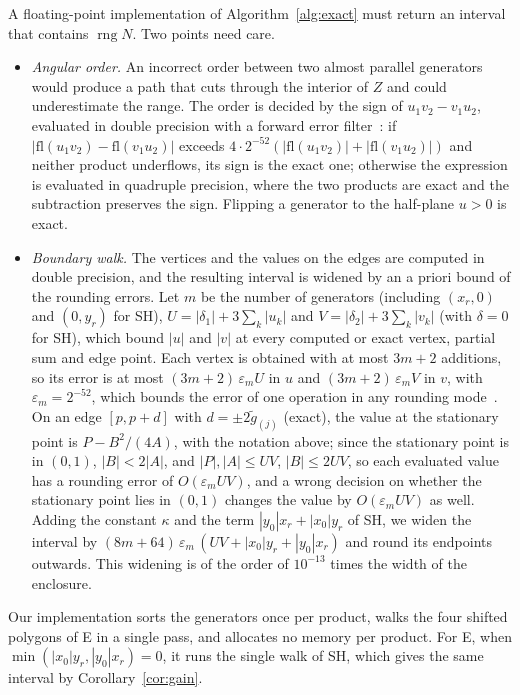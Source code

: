 \documentclass[10pt]{article}
\theoremstyle{definition}
\newcommand{\eps}{\varepsilon}
\newcommand{\rng}{\operatorname{rng}}
\begin{document}
A floating-point implementation of Algorithm~\ref{alg:exact} must return an interval that contains $\rng N$. Two points need care.
\begin{itemize}
\item \emph{Angular order.} An incorrect order between two almost parallel generators would produce a path that cuts through the interior of $Z$ and could underestimate the range. The order is decided by the sign of $u_1v_2-v_1u_2$, evaluated in double precision with a forward error filter~\cite{shewchuk1997adaptive}: if $|\mathrm{fl}(u_1v_2)-\mathrm{fl}(v_1u_2)|$ exceeds $4\cdot2^{-52}(|\mathrm{fl}(u_1v_2)|+|\mathrm{fl}(v_1u_2)|)$ and neither product underflows, its sign is the exact one; otherwise the expression is evaluated in quadruple precision, where the two products are exact and the subtraction preserves the sign. Flipping a generator to the half-plane $u>0$ is exact.
\item \emph{Boundary walk.} The vertices and the values on the edges are computed in double precision, and the resulting interval is widened by an a priori bound of the rounding errors. Let $m$ be the number of generators (including $(x_r,0)$ and $(0,y_r)$ for SH), $U=|\delta_1|+3\sum_k|u_k|$ and $V=|\delta_2|+3\sum_k|v_k|$ (with $\delta=0$ for SH), which bound $|u|$ and $|v|$ at every computed or exact vertex, partial sum and edge point. Each vertex is obtained with at most $3m+2$ additions, so its error is at most $(3m+2)\,\eps_m U$ in $u$ and $(3m+2)\,\eps_m V$ in $v$, with $\eps_m=2^{-52}$, which bounds the error of one operation in any rounding mode~\cite{higham2002accuracy}. On an edge $[p,p+d]$ with $d=\pm2\tilde g_{(j)}$ (exact), the value at the stationary point is $P-B^2/(4A)$, with the notation above; since the stationary point is in $(0,1)$, $|B|<2|A|$, and $|P|,|A|\le UV$, $|B|\le2UV$, so each evaluated value has a rounding error of $O(\eps_m UV)$, and a wrong decision on whether the stationary point lies in $(0,1)$ changes the value by $O(\eps_m UV)$ as well. Adding the constant $\kappa$ and the term $|y_0|x_r+|x_0|y_r$ of SH, we widen the interval by $(8m+64)\,\eps_m\,(UV+|x_0|y_r+|y_0|x_r)$ and round its endpoints outwards. This widening is of the order of $10^{-13}$ times the width of the enclosure.
\end{itemize}
Our implementation sorts the generators once per product, walks the four shifted polygons of E in a single pass, and allocates no memory per product. For E, when $\min(|x_0|y_r,|y_0|x_r)=0$, it runs the single walk of SH, which gives the same interval by Corollary~\ref{cor:gain}.
\end{document}
